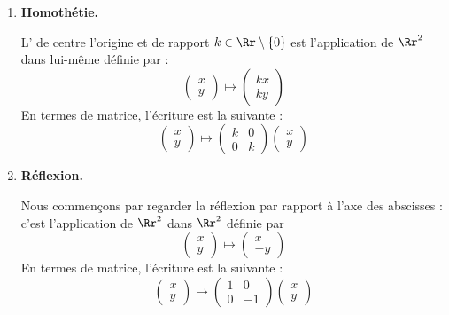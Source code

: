 \documentclass[11pt,class=report,crop=false]{standalone}
\begin{document}
\begin{exemple}
\begin{enumerate}
		\item \textbf{Homothétie.}
		
		\begin{minipage}{0.55\textwidth}
			L' de centre l'origine et de rapport $k \in \Rr\setminus\{0\}$ est l'application 
			de $\Rr^2$ dans lui-même définie par :
			$$\begin{pmatrix}x \\ y \end{pmatrix} \mapsto \begin{pmatrix} kx \\ ky \end{pmatrix}$$
			En termes de matrice, l'écriture est la suivante :
			$$\begin{pmatrix}x \\ y \end{pmatrix} \mapsto \begin{pmatrix}k & 0 \\ 0 & k\end{pmatrix}\begin{pmatrix}x \\ y \end{pmatrix}$$
		\end{minipage}
		\begin{minipage}{0.45\textwidth}
		\end{minipage}
		
		\item \textbf{Réflexion.}
		
		
		\begin{minipage}{0.55\textwidth}
			Nous commençons par regarder la réflexion par rapport à l'axe des abscisses :
			c'est l'application de $\Rr^2$ dans $\Rr^2$ définie par
			$$\begin{pmatrix}x \\ y \end{pmatrix} \mapsto \begin{pmatrix}x \\ -y \end{pmatrix}$$
			En termes de matrice, l'écriture est la suivante :
			$$\begin{pmatrix}x \\ y \end{pmatrix} \mapsto \begin{pmatrix}1 & 0 \\ 0 & -1\end{pmatrix}\begin{pmatrix}x \\ y \end{pmatrix}$$
			

\end{minipage}
\end{enumerate}
\end{exemple}
\end{document}

